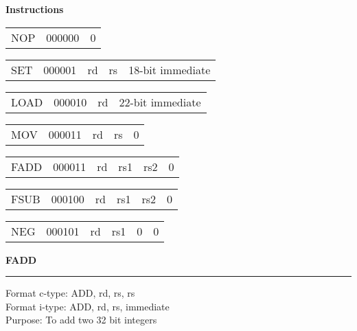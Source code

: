 \documentclass{article}
\begin{document}
\begin{minipage}[t]{0.3\textwidth}
	\begin{center}
		\textbf{Instructions}
	\end{center}
\end{minipage}
\begin{minipage}[t]{110mm}
	\begin{tabular}{p{12mm}|C{15mm}|C{75.15mm}|}
		NOP & 000000 & 0 \\ 
	\end{tabular} 
	
	\medskip

	\begin{tabular}{p{12mm}|C{15mm}|C{10mm}|C{10mm}|C{55.15mm}|}
		SET & 000001 & rd & rs & 18-bit immediate \\
	\end{tabular}

	\medskip
	
	\begin{tabular}{p{12mm}|C{15mm}|C{10mm}|C{65.3mm}|}
		LOAD & 000010 & rd & 22-bit immediate \\
	\end{tabular}

	\medskip

	\begin{tabular}{p{12mm}|C{15mm}|C{10mm}|C{10mm}|C{55.15mm}|}
		MOV & 000011 & rd & rs & 0  \\
	\end{tabular}

	\medskip

	\begin{tabular}{p{12mm}|C{15mm}|C{10mm}|C{10mm}|C{10mm}|C{45mm}|}
		FADD & 000011 & rd & rs1 & rs2 & 0 \\
	\end{tabular}

	\medskip

	\begin{tabular}{p{12mm}|C{15mm}|C{10mm}|C{10mm}|C{10mm}|C{45mm}|}
		FSUB & 000100 & rd & rs1 & rs2 & 0 \\
	\end{tabular}

	\medskip

	\begin{tabular}{p{12mm}|C{15mm}|C{10mm}|C{10mm}|C{10mm}|C{45mm}|}
		NEG & 000101 & rd & rs1 & 0 & 0 \\
	\end{tabular}


\end{minipage}

\pagebreak

\huge\textbf{FADD}\\
\noindent\rule{10cm}{0.4pt}
\normalsize

Format c-type: ADD, rd, rs, rs\\
Format i-type: ADD, rd, rs, immediate\\
Purpose: To add two 32 bit integers
\end{document}
